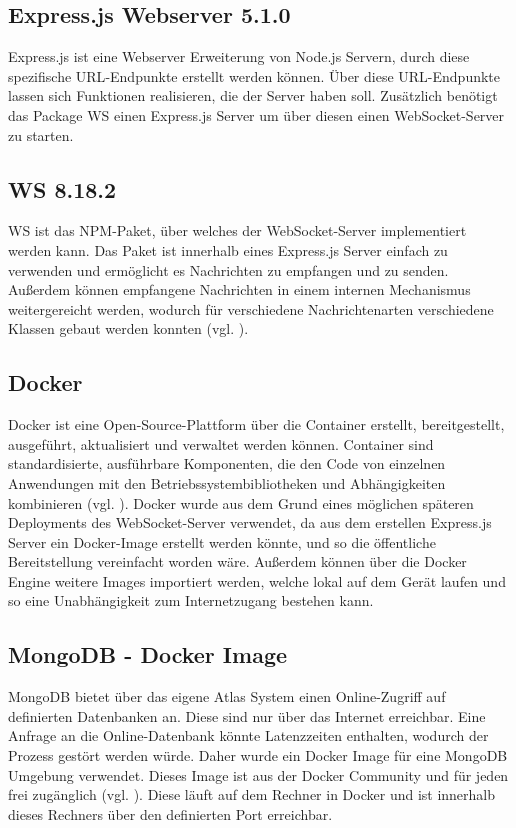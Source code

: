\subsection{Express.js Webserver 5.1.0}
Express.js ist eine Webserver Erweiterung von Node.js Servern, durch diese spezifische \ac{URL}-Endpunkte erstellt werden können. Über diese \ac{URL}-Endpunkte lassen sich Funktionen realisieren, die der Server haben soll. Zusätzlich benötigt das Package WS einen Express.js Server um über diesen einen WebSocket-Server zu starten. 

\subsection{WS 8.18.2}
WS ist das \ac{NPM}-Paket, über welches der WebSocket-Server implementiert werden kann. Das Paket ist innerhalb eines Express.js Server einfach zu verwenden und ermöglicht es Nachrichten zu empfangen und zu senden. Außerdem können empfangene Nachrichten in einem internen Mechanismus weitergereicht werden, wodurch für verschiedene Nachrichtenarten verschiedene Klassen gebaut werden konnten (vgl. \citealp{websockets_websocketsws_2025}).

\subsection{Docker}
Docker ist eine Open-Source-Plattform über die Container erstellt, bereitgestellt, ausgeführt, aktualisiert und verwaltet werden können. Container sind standardisierte, ausführbare Komponenten, die den Code von einzelnen Anwendungen mit den Betriebssystembibliotheken und Abhängigkeiten kombinieren (vgl. \citealp{susnjara_was_2024}). Docker wurde aus dem Grund eines möglichen späteren Deployments des WebSocket-Server verwendet, da aus dem erstellen Express.js Server ein Docker-Image erstellt werden könnte, und so die öffentliche Bereitstellung vereinfacht worden wäre. Außerdem können über die Docker Engine weitere Images importiert werden, welche lokal auf dem Gerät laufen und so eine Unabhängigkeit zum Internetzugang bestehen kann.

\subsection{MongoDB - Docker Image}
MongoDB bietet über das eigene Atlas System einen Online-Zugriff auf definierten Datenbanken an. Diese sind nur über das Internet erreichbar. Eine Anfrage an die Online-Datenbank könnte Latenzzeiten enthalten, wodurch der Prozess gestört werden würde. Daher wurde ein Docker Image für eine MongoDB Umgebung verwendet. Dieses Image ist aus der Docker Community und für jeden frei zugänglich (vgl. \citealp{noauthor_mongo_nodate}). Diese läuft auf dem Rechner in Docker und ist innerhalb dieses Rechners über den definierten Port erreichbar.

